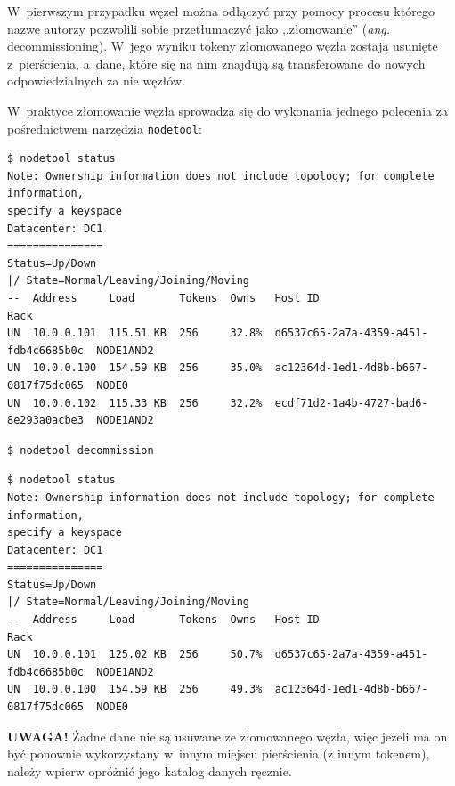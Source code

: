 \documentclass{article} %
\begin{document}
W~pierwszym przypadku węzeł można odłączyć przy pomocy procesu którego nazwę autorzy pozwolili sobie przetłumaczyć jako ,,złomowanie'' (\emph{ang.} decommissioning).
W~jego wyniku tokeny złomowanego węzła zostają usunięte z~pierścienia, a~dane, które się na nim znajdują są transferowane do nowych odpowiedzialnych za nie węzłów.

W~praktyce złomowanie węzła sprowadza się do wykonania jednego polecenia za pośrednictwem narzędzia \texttt{nodetool}:

\begin{lstlisting}[style=bash, caption={stan klastra z~perspektywy węzła w~nim pozostającego}]
$ nodetool status
Note: Ownership information does not include topology; for complete information,
specify a keyspace
Datacenter: DC1
===============
Status=Up/Down
|/ State=Normal/Leaving/Joining/Moving
--  Address     Load       Tokens  Owns   Host ID                               Rack
UN  10.0.0.101  115.51 KB  256     32.8%  d6537c65-2a7a-4359-a451-fdb4c6685b0c  NODE1AND2
UN  10.0.0.100  154.59 KB  256     35.0%  ac12364d-1ed1-4d8b-b667-0817f75dc065  NODE0
UN  10.0.0.102  115.33 KB  256     32.2%  ecdf71d2-1a4b-4727-bad6-8e293a0acbe3  NODE1AND2
\end{lstlisting}

\begin{lstlisting}[style=bash, caption={odłączenie węzła \texttt{NODE2}/10.0.0.102}]
$ nodetool decommission
\end{lstlisting}

\begin{lstlisting}[style=bash, caption={stan klastra z~perspektywy węzła w~nim pozostającego po odłączeniu węzła \texttt{NODE2}}]
$ nodetool status
Note: Ownership information does not include topology; for complete information,
specify a keyspace
Datacenter: DC1
===============
Status=Up/Down
|/ State=Normal/Leaving/Joining/Moving
--  Address     Load       Tokens  Owns   Host ID                               Rack
UN  10.0.0.101  125.02 KB  256     50.7%  d6537c65-2a7a-4359-a451-fdb4c6685b0c  NODE1AND2
UN  10.0.0.100  154.59 KB  256     49.3%  ac12364d-1ed1-4d8b-b667-0817f75dc065  NODE0
\end{lstlisting}

\bigskip

\noindent\textbf{UWAGA!} Żadne dane nie są usuwane ze złomowanego węzła, więc jeżeli ma on być ponownie wykorzystany w~innym miejscu pierścienia (z innym tokenem), należy wpierw opróżnić jego katalog danych ręcznie.
\end{document}
